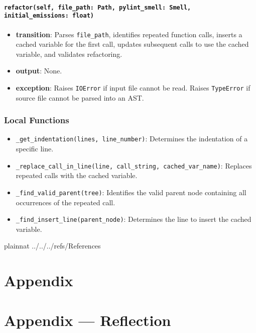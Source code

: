 \documentclass[12pt, titlepage]{article}
\begin{document}
\paragraph{\texttt{refactor(self, file\_path: Path, pylint\_smell: Smell, initial\_emissions: float)}}
\begin{itemize}
  \item \textbf{transition}: Parses \texttt{file\_path}, identifies repeated function calls, inserts a cached variable for the first call, updates subsequent calls to use the cached variable, and validates refactoring.
  \item \textbf{output}: None.
  \item \textbf{exception}: Raises \texttt{IOError} if input file cannot be read. Raises \texttt{TypeError} if source file cannot be parsed into an AST.
\end{itemize}

\subsubsection{Local Functions}
\begin{itemize}
  \item \texttt{\_get\_indentation(lines, line\_number)}: Determines the indentation of a specific line.
  \item \texttt{\_replace\_call\_in\_line(line, call\_string, cached\_var\_name)}: Replaces repeated calls with the cached variable.
  \item \texttt{\_find\_valid\_parent(tree)}: Identifies the valid parent node containing all occurrences of the repeated call.
  \item \texttt{\_find\_insert\_line(parent\_node)}: Determines the line to insert the cached variable.
\end{itemize}

 {plainnat}
 {../../../refs/References}

\newpage

\section{Appendix} \label{Appendix}


\newpage{}

\section*{Appendix --- Reflection}
\end{document}
